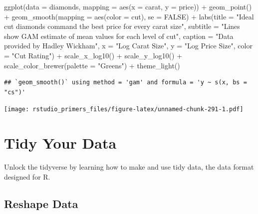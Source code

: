 \documentclass[
]{article}
\newenvironment{Shaded}{\begin{snugshade}}{\end{snugshade}}
\newcommand{\AttributeTok}[1]{\textcolor[rgb]{0.77,0.63,0.00}{#1}}
\newcommand{\ConstantTok}[1]{\textcolor[rgb]{0.00,0.00,0.00}{#1}}
\newcommand{\FunctionTok}[1]{\textcolor[rgb]{0.00,0.00,0.00}{#1}}
\newcommand{\NormalTok}[1]{#1}
\newcommand{\SpecialCharTok}[1]{\textcolor[rgb]{0.00,0.00,0.00}{#1}}
\newcommand{\StringTok}[1]{\textcolor[rgb]{0.31,0.60,0.02}{#1}}
\begin{document}
\begin{Shaded}
\begin{Highlighting}[]
\FunctionTok{ggplot}\NormalTok{(}\AttributeTok{data =}\NormalTok{ diamonds, }\AttributeTok{mapping =} \FunctionTok{aes}\NormalTok{(}\AttributeTok{x =}\NormalTok{ carat, }\AttributeTok{y =}\NormalTok{ price)) }\SpecialCharTok{+}
  \FunctionTok{geom\_point}\NormalTok{() }\SpecialCharTok{+} 
  \FunctionTok{geom\_smooth}\NormalTok{(}\AttributeTok{mapping =} \FunctionTok{aes}\NormalTok{(}\AttributeTok{color =}\NormalTok{ cut), }\AttributeTok{se =} \ConstantTok{FALSE}\NormalTok{) }\SpecialCharTok{+}  
  \FunctionTok{labs}\NormalTok{(}\AttributeTok{title =} \StringTok{"Ideal cut diamonds command the best price for every carat size"}\NormalTok{,}
       \AttributeTok{subtitle =} \StringTok{"Lines show GAM estimate of mean values for each level of cut"}\NormalTok{,}
       \AttributeTok{caption =} \StringTok{"Data provided by Hadley Wickham"}\NormalTok{,}
       \AttributeTok{x =} \StringTok{"Log Carat Size"}\NormalTok{,}
       \AttributeTok{y =} \StringTok{"Log Price Size"}\NormalTok{,}
       \AttributeTok{color =} \StringTok{"Cut Rating"}\NormalTok{) }\SpecialCharTok{+}
  \FunctionTok{scale\_x\_log10}\NormalTok{() }\SpecialCharTok{+}
  \FunctionTok{scale\_y\_log10}\NormalTok{() }\SpecialCharTok{+}
  \FunctionTok{scale\_color\_brewer}\NormalTok{(}\AttributeTok{palette =} \StringTok{"Greens"}\NormalTok{) }\SpecialCharTok{+}
  \FunctionTok{theme\_light}\NormalTok{()}
\end{Highlighting}
\end{Shaded}

\begin{verbatim}
## `geom_smooth()` using method = 'gam' and formula = 'y ~ s(x, bs = "cs")'
\end{verbatim}

\texttt{[image: rstudio\_primers\_files/figure-latex/unnamed-chunk-291-1.pdf]}

\hypertarget{tidy-your-data}{%
\section{Tidy Your Data}\label{tidy-your-data}}

Unlock the tidyverse by learning how to make and use tidy data, the data
format designed for R.

\hypertarget{reshape-data}{%
\subsection{Reshape Data}\label{reshape-data}}
\end{document}
